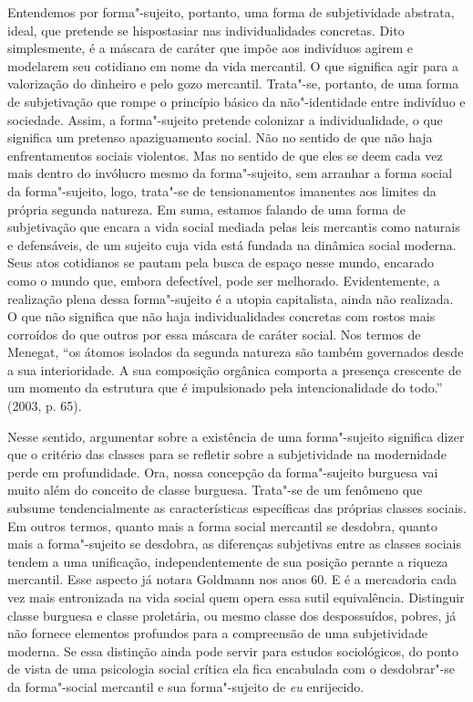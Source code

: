 Entendemos por forma"-sujeito, portanto, uma forma de subjetividade
abstrata, ideal, que pretende se hispostasiar nas individualidades
concretas. Dito simplesmente, é a máscara de caráter que impõe aos
indivíduos agirem e modelarem seu cotidiano em nome da vida mercantil. O
que significa agir para a valorização do dinheiro e pelo gozo mercantil.
Trata"-se, portanto, de uma forma de subjetivação que rompe o princípio
básico da não"-identidade entre indivíduo e sociedade. Assim, a
forma"-sujeito pretende colonizar a individualidade, o que significa um
pretenso apaziguamento social. Não no sentido de que não haja
enfrentamentos sociais violentos. Mas no sentido de que eles se deem
cada vez mais dentro do invólucro mesmo da forma"-sujeito, sem arranhar a
forma social da forma"-sujeito, logo, trata"-se de tensionamentos
imanentes aos limites da própria segunda natureza. Em suma, estamos
falando de uma forma de subjetivação que encara a vida social mediada
pelas leis mercantis como naturais e defensáveis, de um sujeito cuja
vida está fundada na dinâmica social moderna. Seus atos cotidianos se
pautam pela busca de espaço nesse mundo, encarado como o mundo que,
embora defectível, pode ser melhorado. Evidentemente, a realização plena
dessa forma"-sujeito é a utopia capitalista, ainda não realizada. O que
não significa que não haja individualidades concretas com rostos mais
corroídos do que outros por essa máscara de caráter social. Nos termos
de Menegat, ``os átomos isolados da segunda natureza são também
governados desde a sua interioridade. A sua composição orgânica comporta
a presença crescente de um momento da estrutura que é impulsionado pela
intencionalidade do todo.'' (2003, p. 65).

Nesse sentido, argumentar sobre a existência de uma forma"-sujeito
significa dizer que o critério das classes para se refletir sobre a
subjetividade na modernidade perde em profundidade. Ora, nossa concepção
da forma"-sujeito burguesa vai muito além do conceito de classe burguesa.
Trata"-se de um fenômeno que subsume tendencialmente as características
específicas das próprias classes sociais. Em outros termos, quanto mais
a forma social mercantil se desdobra, quanto mais a forma"-sujeito se
desdobra, as diferenças subjetivas entre as classes sociais tendem a uma
unificação, independentemente de sua posição perante a riqueza
mercantil. Esse aspecto já notara Goldmann nos anos 60. E é a mercadoria
cada vez mais entronizada na vida social quem opera essa sutil
equivalência. Distinguir classe burguesa e classe proletária, ou mesmo
classe dos despossuídos, pobres, já não fornece elementos profundos para
a compreensão de uma subjetividade moderna. Se essa distinção ainda pode
servir para estudos sociológicos, do ponto de vista de uma psicologia
social crítica ela fica encabulada com o desdobrar"-se da forma"-social
mercantil e sua forma"-sujeito de \emph{eu} enrijecido.

